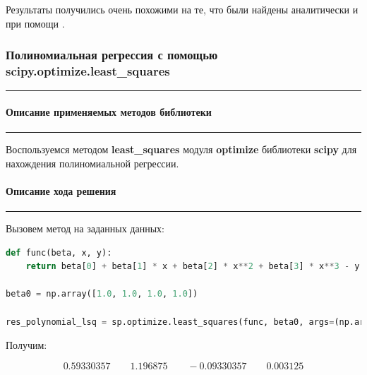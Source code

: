 \documentclass[a4paper, 14pt]{extarticle}
\begin{document}
Результаты получились очень похожими на те, что были найдены аналитически и при помощи .

\subsubsection*{{Полиномиальная регрессия с помощью scipy.optimize.least\_squares}}\vspace{-20pt}\rule{\linewidth}{0.1mm}
\vspace{-30pt}\paragraph*{{Описание применяемых методов библиотеки}}\vspace{-20pt}\rule{\linewidth}{0.1mm}

Воспользуемся методом \textbf{least\_squares} модуля \textbf{optimize} библиотеки \textbf{scipy} для 
нахождения полиномиальной регрессии.

\paragraph*{{Описание хода решения}}\vspace{-20pt}\rule{\linewidth}{0.1mm}

Вызовем метод на заданных данных:

\begin{center}
    \begin{lstlisting}[language=Python]
def func(beta, x, y):
    return beta[0] + beta[1] * x + beta[2] * x**2 + beta[3] * x**3 - y

beta0 = np.array([1.0, 1.0, 1.0, 1.0])

res_polynomial_lsq = sp.optimize.least_squares(func, beta0, args=(np.array(x_values_), np.array(y_values_)))
    \end{lstlisting}
\end{center}

Получим:

\begin{equation*}
    0.59330357 \qquad  1.196875   \qquad -0.09330357 \qquad  0.003125
\end{equation*}
\end{document}
